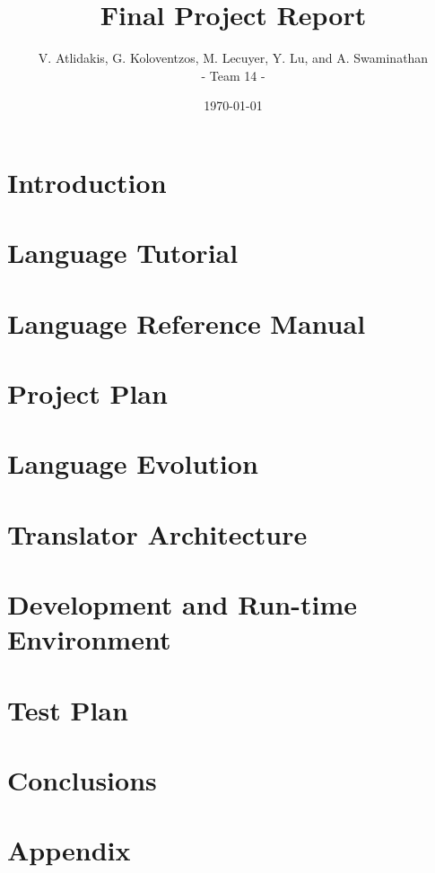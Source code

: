 \documentclass[12pt]{memoir}
\title{\textbf{Final Project Report}}
\author{V. Atlidakis, G. Koloventzos, M. Lecuyer, Y. Lu, and A. Swaminathan \\ - Team 14 -}
\date{\today}
\begin{document}
\maketitle
\tableofcontents
\newpage
\chapter{Introduction}

\chapter{Language Tutorial}

\chapter{Language Reference Manual}

\chapter{Project Plan}

\chapter{Language Evolution}

\chapter{Translator Architecture}

\chapter{Development and Run-time Environment}

\chapter{Test Plan}

\chapter{Conclusions}

\chapter{Appendix}



\end{document}
